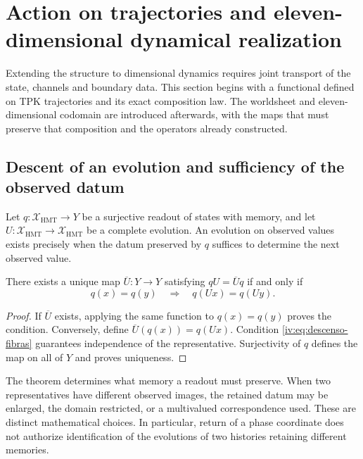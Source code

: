 \section{Action on trajectories and eleven-dimensional dynamical realization}
\label{iv:accion-realizacion}

Extending the structure to dimensional dynamics requires
joint transport of the state, channels and boundary
data. This section begins with a functional defined on
TPK trajectories and its exact composition law.
The worldsheet and eleven-dimensional codomain are
introduced afterwards, with the maps that must preserve that
composition and the operators already constructed.

\subsection{Descent of an evolution and sufficiency of the observed datum}

Let \(q:\mathcal X_{\mathrm{HMT}}\to Y\) be a surjective
readout of states with memory, and let
\(U:\mathcal X_{\mathrm{HMT}}\to\mathcal X_{\mathrm{HMT}}\)
be a complete evolution. An evolution on observed
values exists precisely when the datum preserved by
\(q\) suffices to determine the next observed value.

\begin{theorem}
\label{iv:thm:descenso-fibras}
There exists a unique map \(\overline U:Y\to Y\)
satisfying \(qU=\overline Uq\) if and only if
\begin{equation}
 q(x)=q(y)\quad\Longrightarrow\quad q(Ux)=q(Uy).
 \label{iv:eq:descenso-fibras}
\end{equation}
\end{theorem}
\begin{proof}
If \(\overline U\) exists, applying the same function to
\(q(x)=q(y)\) proves the condition. Conversely,
define \(\overline U(q(x))=q(Ux)\). Condition
\eqref{iv:eq:descenso-fibras} guarantees independence of the
representative. Surjectivity of \(q\) defines the
map on all of \(Y\) and proves uniqueness.
\end{proof}

The theorem determines what memory a readout
must preserve. When two representatives have different observed
images, the retained datum may be enlarged, the domain
restricted, or a multivalued correspondence used.
These are distinct mathematical choices. In particular,
return of a phase coordinate does not authorize identification
of the evolutions of two histories retaining different
memories.

